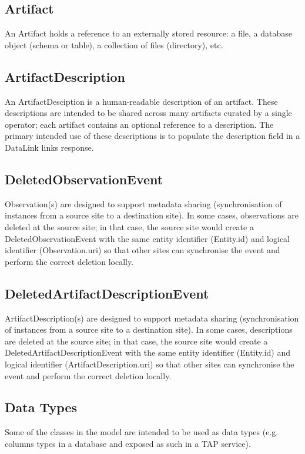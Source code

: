 \documentclass[11pt,a4paper]{ivoa}
\begin{document}
\subsection{Artifact}

An Artifact holds a reference to an externally stored resource: a file, a
database object (schema or table), a collection of files (directory), etc.

\subsection{ArtifactDescription}

An ArtifactDesciption is a human-readable description of an artifact. These
descriptions are intended to be shared across many artifacts curated by a single
operator; each artifact contains an optional reference to a description. The
primary intended use of these descriptions is to populate the description field
in a DataLink links response.

\subsection{DeletedObservationEvent}

Observation(s) are designed to support metadata sharing (synchronisation of instances
from a source site to a destination site). In some cases, observations are deleted at the 
source site; in that case, the source site would create a DeletedObservationEvent with the same 
entity identifier (Entity.id) and logical identifier (Observation.uri) so that other sites can
synchronise the event and perform the correct deletion locally.

\subsection{DeletedArtifactDescriptionEvent}

ArtifactDescription(s) are designed to support metadata sharing (synchronisation of instances
from a source site to a destination site). In some cases, descriptions are deleted at the 
source site; in that case, the source site would create a DeletedArtifactDescriptionEvent with 
the same entity identifier (Entity.id) and logical identifier (ArtifactDescription.uri) so that 
other sites can synchronise the event and perform the correct deletion locally.

\subsection{Data Types}
Some of the classes in the model are intended to be used as data types (e.g. columns
types in a database and exposed as such in a TAP service).
\end{document}
